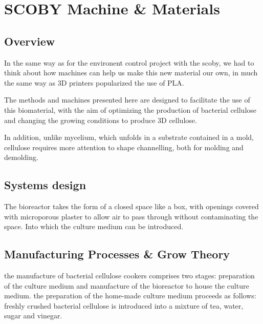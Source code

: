 \chapter{SCOBY Machine \& Materials}


\section{Overview}

In the same way as for the environent control project with the scoby, we had to think about how machines can help us make this new material our own, in much the same way as 3D printers popularized the use of PLA. 

The methods and machines presented here are designed to facilitate the use of this biomaterial, with the aim of optimizing the production of bacterial cellulose and changing the growing conditions to produce 3D cellulose. 

In addition, unlike mycelium, which unfolds in a substrate contained in a mold, cellulose requires more attention to shape channelling, both for molding and demolding. 


\section{Systems design}
The bioreactor takes the form of a closed space like a box, with openings covered with microporous plaster to allow air to pass through without contaminating the space. Into which the culture medium can be introduced.




\section{Manufacturing Processes \& Grow Theory}


the manufacture of bacterial cellulose cookers comprises two stages: preparation of the culture medium and manufacture of the bioreactor to house the culture medium. 
the preparation of the home-made culture medium proceeds as follows:
freshly crushed bacterial cellulose is introduced into a mixture of tea, water, sugar and vinegar. 


